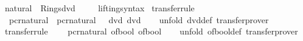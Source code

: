 \begin{isabellebody}
\endisatagproof
{\isafoldproof}%
%
\isadelimproof
%
\endisadelimproof
\isanewline
\isanewline
{}\isamarkupfalse%
\isanewline
\isanewline
{}\isamarkupfalse%
\ natural\ {\isacharcolon}{\kern0pt}{\isacharcolon}{\kern0pt}\ Rings{\isachardot}{\kern0pt}dvd%
\isadelimproof
\ %
\endisadelimproof
%
\isatagproof
\isacommand{{\isachardot}{\kern0pt}{\isachardot}{\kern0pt}}\isamarkupfalse%
%
\endisatagproof
{\isafoldproof}%
%
\isadelimproof
%
\endisadelimproof
\isanewline
\isanewline
{}\isamarkupfalse%
\isanewline
\ \ \ lifting{\isacharunderscore}{\kern0pt}syntax\isanewline
{}\isanewline
\isanewline
{}\isamarkupfalse%
\ {\isacharbrackleft}{\kern0pt}transfer{\isacharunderscore}{\kern0pt}rule{\isacharbrackright}{\kern0pt}{\isacharcolon}{\kern0pt}\isanewline
\ \ {\isacartoucheopen}{\isacharparenleft}{\kern0pt}pcr{\isacharunderscore}{\kern0pt}natural\ {\isacharequal}{\kern0pt}{\isacharequal}{\kern0pt}{\isacharequal}{\kern0pt}{\isachargreater}{\kern0pt}\ pcr{\isacharunderscore}{\kern0pt}natural\ {\isacharequal}{\kern0pt}{\isacharequal}{\kern0pt}{\isacharequal}{\kern0pt}{\isachargreater}{\kern0pt}\ {\isacharparenleft}{\kern0pt}{\isasymlongleftrightarrow}{\isacharparenright}{\kern0pt}{\isacharparenright}{\kern0pt}\ {\isacharparenleft}{\kern0pt}dvd{\isacharparenright}{\kern0pt}\ {\isacharparenleft}{\kern0pt}dvd{\isacharparenright}{\kern0pt}{\isacartoucheclose}\isanewline
%
\isadelimproof
\ \ %
\endisadelimproof
%
\isatagproof
{}\isamarkupfalse%
\ {\isacharparenleft}{\kern0pt}unfold\ dvd{\isacharunderscore}{\kern0pt}def{\isacharparenright}{\kern0pt}\ transfer{\isacharunderscore}{\kern0pt}prover%
\endisatagproof
{\isafoldproof}%
%
\isadelimproof
\isanewline
%
\endisadelimproof
\isanewline
{}\isamarkupfalse%
\ {\isacharbrackleft}{\kern0pt}transfer{\isacharunderscore}{\kern0pt}rule{\isacharbrackright}{\kern0pt}{\isacharcolon}{\kern0pt}\isanewline
\ \ {\isacartoucheopen}{\isacharparenleft}{\kern0pt}{\isacharparenleft}{\kern0pt}{\isasymlongleftrightarrow}{\isacharparenright}{\kern0pt}\ {\isacharequal}{\kern0pt}{\isacharequal}{\kern0pt}{\isacharequal}{\kern0pt}{\isachargreater}{\kern0pt}\ pcr{\isacharunderscore}{\kern0pt}natural{\isacharparenright}{\kern0pt}\ of{\isacharunderscore}{\kern0pt}bool\ of{\isacharunderscore}{\kern0pt}bool{\isacartoucheclose}\isanewline
%
\isadelimproof
\ \ %
\endisadelimproof
%
\isatagproof
{}\isamarkupfalse%
\ {\isacharparenleft}{\kern0pt}unfold\ of{\isacharunderscore}{\kern0pt}bool{\isacharunderscore}{\kern0pt}def{\isacharparenright}{\kern0pt}\ transfer{\isacharunderscore}{\kern0pt}prover%

\end{isabellebody}
